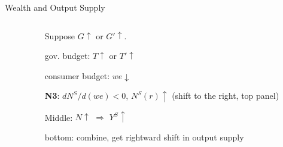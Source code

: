 \documentclass[11pt,aspectratio=169,usenames,dvipsnames]{beamer}
\let\tempone\itemize
\let\temptwo\enditemize
\renewenvironment{itemize}{\tempone\addtolength{\itemsep}{\fill}}{\temptwo}
\begin{document}
\begin{frame}{Wealth and Output Supply}
\begin{columns}
\begin{column}{0.5\textwidth}
        \end{column}
        \begin{column}{0.5\textwidth}
            Suppose $ G \uparrow  $ or $ G' \uparrow  $.
            \begin{itemize}
                \item gov. budget: $ T \uparrow  $ or $ T' \uparrow  $
                \item consumer budget: $ we \downarrow  $
                \item \textbf{N3}: $ \displaystyle d N^{S} / d ( we ) < 0 $, $ N^{S}( r ) \uparrow  $ (shift to the right, top panel)
                \item Middle: $ N\uparrow  $ $ \Rightarrow  $ $ Y^{S} \uparrow  $
                \item bottom: combine, get rightward shift in output supply
            \end{itemize}
        \end{column}
    \end{columns}
\end{frame}
\end{document}
